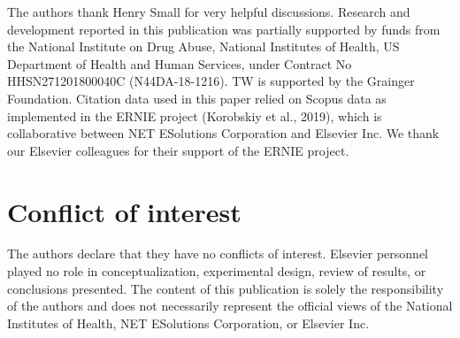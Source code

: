 \begin{acknowledgements} The authors thank Henry Small for very helpful discussions. Research and development reported in this publication was partially supported by funds from the National Institute on Drug Abuse, National Institutes of Health, US Department of Health and Human Services, under Contract No HHSN271201800040C (N44DA-18-1216). TW is supported by the Grainger Foundation. Citation data used in this paper relied on Scopus data as implemented in the ERNIE project (Korobskiy et al., 2019), which is collaborative between NET ESolutions Corporation and Elsevier Inc. We thank our Elsevier colleagues for their support of the ERNIE project.
\end{acknowledgements}

%
 \section*{Conflict of interest}
The authors declare that they have no conflicts of interest. Elsevier personnel played no role in conceptualization, experimental design, review of results, or conclusions presented. The content of this publication is solely the responsibility of the authors and does not necessarily represent the official views of the National Institutes of Health, NET ESolutions Corporation, or Elsevier Inc.







\listofchanges



